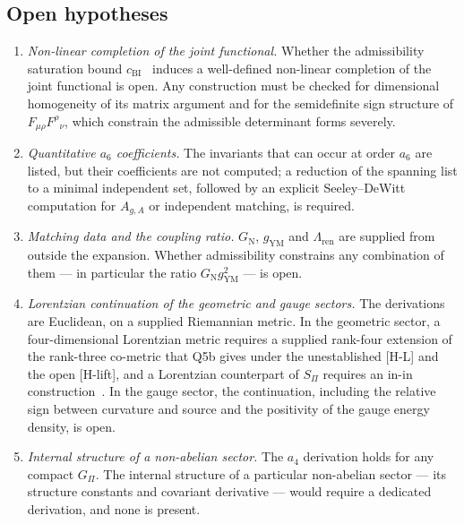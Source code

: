 \documentclass[11pt,a4paper]{article}
\theoremstyle{definition}
\newcommand{\GN}{G_{\mathrm{N}}}
\newcommand{\gYM}{g_{\mathrm{YM}}}
\newcommand{\cchi}{c_{\mathrm{BI}}}
\newcommand{\SPI}{S_\Pi}
\newcommand{\Gpi}{G_\Pi}
\begin{document}
    \subsection{Open hypotheses}
      \label{sec:open-hyp}

      \begin{enumerate}
        \item \textit{Non-linear completion of the joint functional.}
        Whether the admissibility saturation bound $\cchi$~\cite{Beau2026c} induces a well-defined non-linear
        completion of the joint functional is open. Any construction must be checked for
        dimensional homogeneity of its matrix argument and for the semidefinite sign structure of
        $F_{\mu\rho}F^{\rho}{}_{\nu}$, which constrain the admissible determinant forms severely.

        \item \textit{Quantitative $a_6$ coefficients.}
        The invariants that can occur at order $a_6$ are listed, but their coefficients are not
        computed; a reduction of the spanning list to a minimal independent set, followed by an
        explicit Seeley--DeWitt computation for $A_{g,A}$ or independent matching, is required.

        \item \textit{Matching data and the coupling ratio.}
        $\GN$, $\gYM$ and $\Lambda_{\mathrm{ren}}$ are supplied from outside the expansion.
        Whether admissibility constrains any combination of them --- in particular the ratio
        $\GN\gYM^2$ --- is open.

        \item \textit{Lorentzian continuation of the geometric and gauge sectors.}
        The derivations are Euclidean, on a supplied Riemannian metric.
        In the geometric sector, a four-dimensional Lorentzian metric requires a supplied rank-four extension of
        the rank-three co-metric that Q5b gives under the unestablished [H-L] and the open [H-lift], and a
        Lorentzian counterpart of $\SPI$ requires an in-in construction~\cite{Beau2026i}.
        In the gauge sector, the continuation, including the relative sign between curvature and source and the
        positivity of the gauge energy density, is open.

        \item \textit{Internal structure of a non-abelian sector.}
        The $a_4$ derivation holds for any compact $\Gpi$.
        The internal structure of a particular non-abelian sector --- its structure constants and
        covariant derivative --- would require a dedicated derivation, and none is present.


\end{enumerate}
\end{document}
